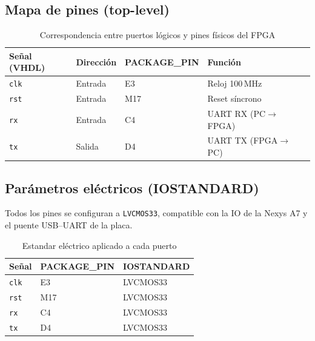 \documentclass[a4paper,12pt]{article}
\begin{document}
\subsection{Mapa de pines (top-level)}
\begin{table}[H]
\centering
\caption{Correspondencia entre puertos lógicos y pines físicos del FPGA}
\label{tab:pinmap}
\begin{tabular}{@{}lllll@{}}
\toprule
\textbf{Señal (VHDL)} & \textbf{Dirección} & \textbf{PACKAGE\_PIN} & \textbf{Función} & \\
\midrule
\texttt{clk}          & Entrada            & E3                    & Reloj 100\,MHz   \\
\texttt{rst}          & Entrada            & M17                   & Reset síncrono    \\
\texttt{rx}           & Entrada            & C4                    & UART RX (PC$\rightarrow$FPGA) \\
\texttt{tx}           & Salida             & D4                    & UART TX (FPGA$\rightarrow$PC)  \\
\bottomrule
\end{tabular}
\end{table}

\subsection{Parámetros eléctricos (IOSTANDARD)}
Todos los pines se configuran a \texttt{LVCMOS33}, compatible con la IO de la Nexys A7 y el puente USB--UART de la placa.

\begin{table}[H]
\centering
\caption{Estandar eléctrico aplicado a cada puerto}
\label{tab:iostandard}
\begin{tabular}{@{}lll@{}}
\toprule
\textbf{Señal} & \textbf{PACKAGE\_PIN} & \textbf{IOSTANDARD} \\
\midrule
\texttt{clk}   & E3                    & LVCMOS33 \\
\texttt{rst}   & M17                   & LVCMOS33 \\
\texttt{rx}    & C4                    & LVCMOS33 \\
\texttt{tx}    & D4                    & LVCMOS33 \\
\bottomrule
\end{tabular}
\end{table}

\newpage
\end{document}
